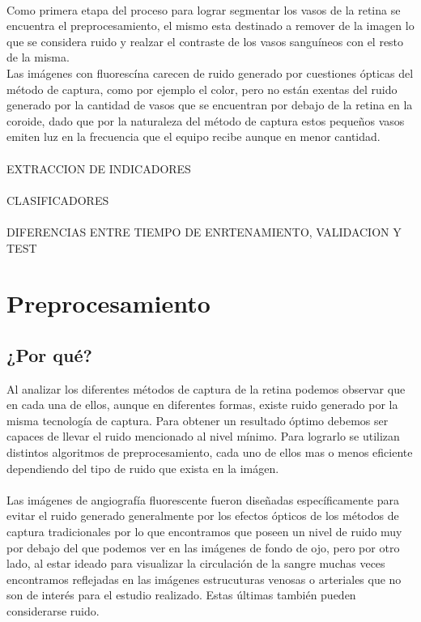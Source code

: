 \paragraph{}
Como primera etapa del proceso para lograr segmentar los vasos de la retina se encuentra el preprocesamiento, el mismo esta destinado a remover de la imagen lo que se considera ruido y realzar el contraste de los vasos sangu\'ineos con el resto de la misma.\\
Las im\'agenes con fluoresc\'ina carecen de ruido generado por cuestiones \'opticas del m\'etodo de captura, como por ejemplo el color, pero no est\'an exentas del ruido generado por la cantidad de vasos que se encuentran por debajo de la retina en la coroide, dado que por la naturaleza del m\'etodo de captura estos peque\~nos vasos emiten luz en la frecuencia que el equipo recibe aunque en menor cantidad.

\paragraph{}
EXTRACCION DE INDICADORES

\paragraph{}
CLASIFICADORES

\paragraph{}
DIFERENCIAS ENTRE TIEMPO DE ENRTENAMIENTO, VALIDACION Y TEST


\section{Preprocesamiento}
\subsection{¿Por qu\'e?}
Al analizar los diferentes m\'etodos de captura de la retina podemos observar que en cada una de ellos, aunque en diferentes formas, existe ruido generado por la misma tecnolog\'ia de captura. Para obtener un resultado \'optimo debemos ser capaces de llevar el ruido mencionado al nivel m\'inimo. Para lograrlo se utilizan distintos algoritmos de preprocesamiento, cada uno de ellos mas o menos eficiente dependiendo del tipo de ruido que exista en la im\'agen.
\paragraph{}
Las im\'agenes de angiograf\'ia fluorescente fueron diseñadas espec\'ificamente para evitar el ruido generado generalmente por los efectos \'opticos de los m\'etodos de captura tradicionales por lo que encontramos que poseen un nivel de ruido muy por debajo del que podemos ver en las im\'agenes de fondo de ojo, pero por otro lado, al estar ideado para visualizar la circulaci\'on de la sangre muchas veces encontramos reflejadas en las im\'agenes estrucuturas venosas o arteriales que no son de inter\'es para el estudio realizado. Estas \'ultimas tambi\'en pueden considerarse ruido.
